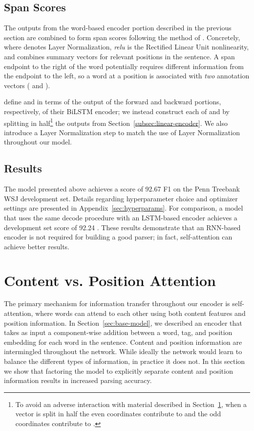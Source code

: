 \documentclass[11pt,a4paper]{article}
\begin{document}
\subsection{Span Scores}
\label{subsec:span-encoder}

The outputs  from the word-based encoder portion described in the previous section are combined to form span scores  following the method of \citet{stern_minimal_2017}.
Concretely, 
where  denotes Layer Normalization, \emph{relu} is the Rectified Linear Unit nonlinearity, and  combines summary vectors for relevant positions in the sentence. A span endpoint to the right of the word potentially requires different information from the endpoint to the left, so a word at a position  is associated with \emph{two} annotation vectors ( and ). 

\citet{stern_minimal_2017} define  and  in terms of the output of the forward and backward portions, respectively, of their BiLSTM encoder; we instead construct each of  and  by splitting in half\footnote{To avoid an adverse interaction with material described in Section~\ref{sec:factored-model}, when a vector  is split in half the even coordinates contribute to  and the odd coordinates contribute to .} the outputs  from Section~\ref{subsec:linear-encoder}. We also introduce a Layer Normalization step to match the use of Layer Normalization throughout our model. 

\subsection{Results}

The model presented above achieves a score of 92.67 F1 on the Penn Treebank WSJ development set. Details regarding hyperparameter choice and optimizer settings are presented in Appendix~\ref{sec:hyperparams}.
For comparison, a model that uses the same decode procedure with an LSTM-based encoder achieves a development set score of 92.24 \citep{gaddy_analysis_2018}. These results demonstrate that an RNN-based encoder is not required for building a good parser; in fact, self-attention can achieve better results.
  
\section{Content vs. Position Attention}
\label{sec:factored-model}

The primary mechanism for information transfer throughout our encoder is self-attention, where words can attend to each other using both content features and position information. In Section~\ref{sec:base-model}, we described an encoder that takes as input a component-wise addition between a word, tag, and position embedding for each word in the sentence. Content and position information are intermingled throughout the network. While ideally the network would learn to balance the different types of information, in practice it does not. In this section we show that factoring the model to explicitly separate content and position information results in increased parsing accuracy. 
\end{document}
